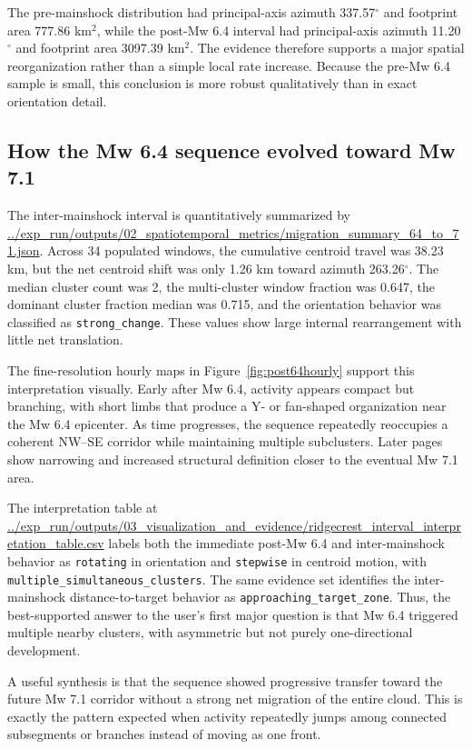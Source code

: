 \documentclass[11pt]{article}
\begin{document}
The pre-mainshock distribution had principal-axis azimuth 337.57$^{\circ}$ and footprint area 777.86 km$^2$, while the post-Mw 6.4 interval had principal-axis azimuth 11.20$^{\circ}$ and footprint area 3097.39 km$^2$. The evidence therefore supports a major spatial reorganization rather than a simple local rate increase. Because the pre-Mw 6.4 sample is small, this conclusion is more robust qualitatively than in exact orientation detail.

\subsection{How the Mw 6.4 sequence evolved toward Mw 7.1}
The inter-mainshock interval is quantitatively summarized by
\url{../exp_run/outputs/02_spatiotemporal_metrics/migration_summary_64_to_71.json}.
Across 34 populated windows, the cumulative centroid travel was 38.23 km, but the net centroid shift was only 1.26 km toward azimuth 263.26$^{\circ}$. The median cluster count was 2, the multi-cluster window fraction was 0.647, the dominant cluster fraction median was 0.715, and the orientation behavior was classified as \texttt{strong\_change}. These values show large internal rearrangement with little net translation.

The fine-resolution hourly maps in Figure~\ref{fig:post64hourly} support this interpretation visually. Early after Mw 6.4, activity appears compact but branching, with short limbs that produce a Y- or fan-shaped organization near the Mw 6.4 epicenter. As time progresses, the sequence repeatedly reoccupies a coherent NW--SE corridor while maintaining multiple subclusters. Later pages show narrowing and increased structural definition closer to the eventual Mw 7.1 area.

The interpretation table at
\url{../exp_run/outputs/03_visualization_and_evidence/ridgecrest_interval_interpretation_table.csv}
labels both the immediate post-Mw 6.4 and inter-mainshock behavior as \texttt{rotating} in orientation and \texttt{stepwise} in centroid motion, with \texttt{multiple\_simultaneous\_clusters}. The same evidence set identifies the inter-mainshock distance-to-target behavior as \texttt{approaching\_target\_zone}. Thus, the best-supported answer to the user's first major question is that Mw 6.4 triggered multiple nearby clusters, with asymmetric but not purely one-directional development.

A useful synthesis is that the sequence showed progressive transfer toward the future Mw 7.1 corridor without a strong net migration of the entire cloud. This is exactly the pattern expected when activity repeatedly jumps among connected subsegments or branches instead of moving as one front.
\end{document}
